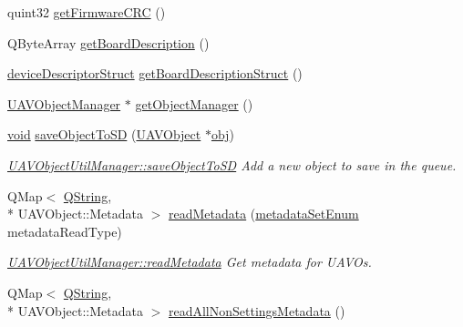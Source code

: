\begin{DoxyCompactItemize}
\item 
quint32 \hyperlink{group___u_a_v_objects_plugin_ga2aa3a13d1eb39329f28842887c6d7db6}{get\-Firmware\-C\-R\-C} ()
\item 
Q\-Byte\-Array \hyperlink{group___u_a_v_object_util_plugin_ga1c07eaa903b38480c6eb46b1a312f66e}{get\-Board\-Description} ()
\item 
\hyperlink{classdevice_descriptor_struct}{device\-Descriptor\-Struct} \hyperlink{group___u_a_v_objects_plugin_ga37ed95a95ca8906a45b06bb7174b1158}{get\-Board\-Description\-Struct} ()
\item 
\hyperlink{class_u_a_v_object_manager}{U\-A\-V\-Object\-Manager} $\ast$ \hyperlink{group___u_a_v_objects_plugin_ga9a99c93b8210149fd59246e2648a9c59}{get\-Object\-Manager} ()
\item 
\hyperlink{group___u_a_v_objects_plugin_ga444cf2ff3f0ecbe028adce838d373f5c}{void} \hyperlink{group___u_a_v_object_util_plugin_ga007cecfcbf4a9d18c1f2c9ec13de4222}{save\-Object\-To\-S\-D} (\hyperlink{class_u_a_v_object}{U\-A\-V\-Object} $\ast$\hyperlink{glext_8h_a0c0d4701a6c89f4f7f0640715d27ab26}{obj})
\begin{DoxyCompactList}\small\item\em \hyperlink{group___u_a_v_object_util_plugin_ga007cecfcbf4a9d18c1f2c9ec13de4222}{U\-A\-V\-Object\-Util\-Manager\-::save\-Object\-To\-S\-D} Add a new object to save in the queue. \end{DoxyCompactList}\item 
Q\-Map$<$ \hyperlink{group___u_a_v_objects_plugin_gab9d252f49c333c94a72f97ce3105a32d}{Q\-String}, \\*
U\-A\-V\-Object\-::\-Metadata $>$ \hyperlink{group___u_a_v_object_util_plugin_gac4fbb0efd0a309169dea095945710ed3}{read\-Metadata} (\hyperlink{group___u_a_v_objects_plugin_ga3f0971e47d6ebe87f97939435cd03da3}{metadata\-Set\-Enum} metadata\-Read\-Type)
\begin{DoxyCompactList}\small\item\em \hyperlink{group___u_a_v_object_util_plugin_gac4fbb0efd0a309169dea095945710ed3}{U\-A\-V\-Object\-Util\-Manager\-::read\-Metadata} Get metadata for U\-A\-V\-Os. \end{DoxyCompactList}\item 
Q\-Map$<$ \hyperlink{group___u_a_v_objects_plugin_gab9d252f49c333c94a72f97ce3105a32d}{Q\-String}, \\*
U\-A\-V\-Object\-::\-Metadata $>$ \hyperlink{group___u_a_v_object_util_plugin_ga1bc82b9cb256ba0c3974bab7489aba4a}{read\-All\-Non\-Settings\-Metadata} ()

\end{DoxyCompactItemize}
